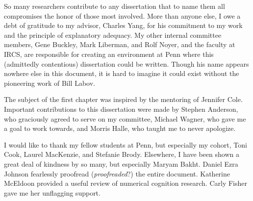 So many researchers contribute to any dissertation that to name them all compromises the honor of those most involved. More than anyone else, I owe a debt of gratitude to my advisor, Charles Yang, for his commitment to my work and the principle of explanatory adequacy. My other internal committee members, Gene Buckley, Mark Liberman, and Rolf Noyer, and the faculty at IRCS, are responsible for creating an environment at Penn where this (admittedly contentious) dissertation could be written. Though his name appears nowhere else in this document, it is hard to imagine it could exist without the pioneering work of Bill Labov.

The subject of the first chapter was inspired by the mentoring of Jennifer Cole. Important contributions to this dissertation were made by Stephen Anderson, who graciously agreed to serve on my committee, Michael Wagner, who gave me a goal to work towards, and Morris Halle, who taught me to never apologize.

I would like to thank my fellow students at Penn, but especially my cohort, Toni Cook, Laurel MacKenzie, and Stefanie Brody. Elsewhere, I have been shown a great deal of kindness by so many, but especially Maryam Bakht. Daniel Ezra Johnson fearlessly proofread (\emph{proofreaded}?) the entire document. Katherine McEldoon provided a useful review of numerical cognition research. Carly Fisher gave me her unflagging support.

